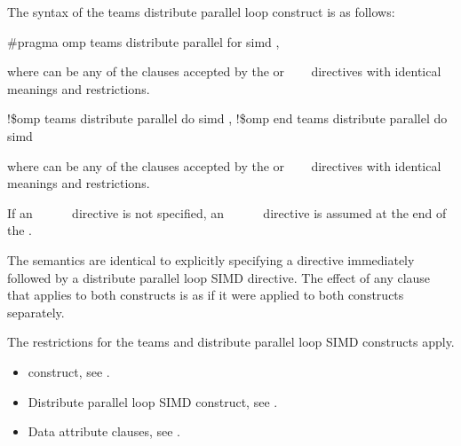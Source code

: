 \syntax
The syntax of the teams distribute parallel loop construct is as follows:

\ccppspecificstart
\begin{boxedcode}
\#pragma omp teams distribute parallel for simd \plc{[clause[ [},\plc{] clause] ... ]}
\end{boxedcode}

where  can be any of the clauses accepted by the  or 
~~~
directives with identical meanings and restrictions.
\ccppspecificend

\fortranspecificstart
\begin{boxedcode}
!\$omp teams distribute parallel do simd \plc{[clause[ [},\plc{] clause] ... ]}
\plc{[}!\$omp end teams distribute parallel do simd\plc{]}
\end{boxedcode}

where  can be any of the clauses accepted by the  or 
~~~
directives with identical meanings and restrictions.

If an ~~~~~ directive is not specified, an 
~~~~~ directive is assumed at the end of 
the .
\fortranspecificend

\descr
The semantics are identical to explicitly specifying a  directive immediately 
followed by a distribute parallel loop SIMD directive. The effect of any clause that 
applies to both constructs is as if it were applied to both constructs separately.

\restrictions
The restrictions for the teams and distribute parallel loop SIMD constructs apply.

\crossreferences
\begin{itemize}
\item {} construct, see 
.

\item Distribute parallel loop SIMD construct, see 
.

\item Data attribute clauses, see 
.
\end{itemize}










